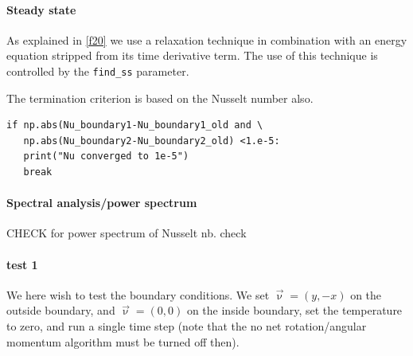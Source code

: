 \paragraph{Steady state} As explained in \ref{f20} we use a relaxation technique
in combination with an energy equation stripped from its time derivative term. 
The use of this technique is controlled by the {\tt find\_ss} parameter.

The termination criterion is based on the Nusselt number also. 
\begin{lstlisting}
if np.abs(Nu_boundary1-Nu_boundary1_old and \
   np.abs(Nu_boundary2-Nu_boundary2_old) <1.e-5:
   print("Nu converged to 1e-5")
   break
\end{lstlisting}

\paragraph{Spectral analysis/power spectrum}
CHECK \cite{brha09} for power spectrum of Nusselt nb.
check \cite{buri96,mczh05b,puhj95,rozh06,scbg90,wema98,ribr99}


\paragraph{test 1}

We here wish to test the boundary conditions. We set $\vec{\upnu}=(y,-x)$ on the outside 
boundary, and $\vec{\upnu}=(0,0)$ on the inside boundary, set the temperature to zero, 
and run a single time step (note that the no net rotation/angular momentum algorithm 
must be turned off then).

